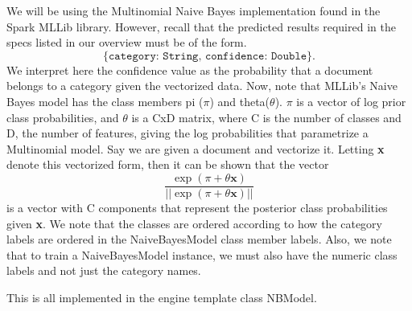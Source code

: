 \documentclass[a4paper,12pt]{article}
\renewcommand{\bf}[1]{\textbf{#1}}
\renewcommand{\tt}[1]{\texttt{#1}}
\newcommand{\3}{\left}
\newcommand{\4}{\right}
\renewcommand{\-}[1]{{}^{-#1}}
\begin{document}
We will be using the Multinomial Naive Bayes implementation found in the Spark MLLib library. However, recall that the predicted results required in the specs listed in our overview must be of the form.
$$
\tt{\{category: String, confidence: Double\}}.
$$
We interpret here the confidence value as the probability that a document belongs to a category given the vectorized data. Now, note that MLLib's Naive Bayes model has the class members pi ($\pi$) and theta($\theta$). $\pi$ is a vector of log prior class probabilities, and $\theta$ is a CxD matrix, where C is the number of classes and D, the number of features, giving the log probabilities that parametrize a Multinomial model. Say we are given a document and vectorize it. Letting \bf{x} denote this vectorized form, then it can be shown that the vector 
$$
\frac{\exp\3(\pi + \theta\bf{x}\4)}{||\exp\3(\pi + \theta\bf{x}\4)||}
$$
is a vector with C components that represent the posterior class probabilities given \bf{x}. We note that the classes are ordered according to how the category labels are ordered in the NaiveBayesModel class member labels. Also, we note that to train a NaiveBayesModel instance, we must also have the numeric class labels and not just the category names.

This is all implemented in the engine template class NBModel.
\end{document}
